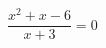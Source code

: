 \begin{ex}[type=equation]
	\begin{condition}
		\( \dfrac{x^2+x-6}{x+3}=0 \)
	\end{condition}
\end{ex}